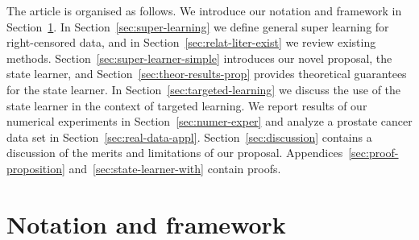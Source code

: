 \documentclass[numsec,webpdf,contemporary,medium,namedate]{oup-authoring-template}%
\theoremstyle{thmstyleone}%
\theoremstyle{thmstyletwo}%
\theoremstyle{thmstylethree}%
\newcommand{\1}{\mathds{1}}
\begin{document}
The article is organised as follows. We introduce our notation and
framework in Section~\ref{sec:framework}. In
Section~\ref{sec:super-learning} we define general super learning
for right-censored data, and in Section~\ref{sec:relat-liter-exist}
we review existing methods.  Section~\ref{sec:super-learner-simple}
introduces our novel proposal, the state learner, and
Section~\ref{sec:theor-results-prop} provides theoretical guarantees
for the state learner. In Section~\ref{sec:targeted-learning} we
discuss the use of the state learner in the context of targeted
learning. We report results of our numerical experiments in
Section~\ref{sec:numer-exper} and analyze a prostate cancer data set
in Section~\ref{sec:real-data-appl}.  Section~\ref{sec:discussion}
contains a discussion of the merits and limitations of our
proposal. Appendices~\ref{sec:proof-proposition}
and~\ref{sec:state-learner-with} contain proofs.


\section{Notation and framework}
\label{sec:framework}
\end{document}
